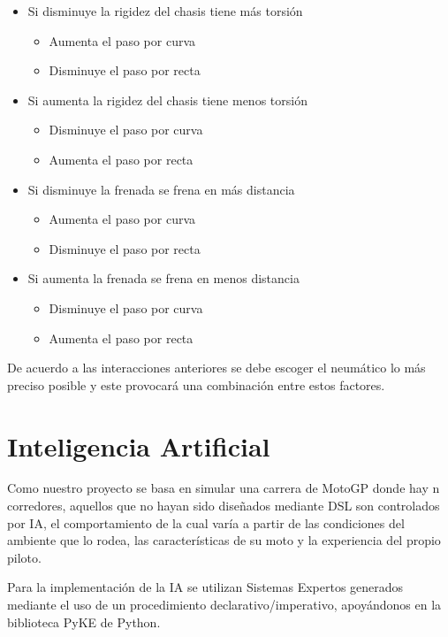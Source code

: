 \documentclass[12pt, letterpaper,spanish]{article}
\theoremstyle{definition}
\theoremstyle{remark}
\begin{document}
\begin{itemize}
		\item Si disminuye la rigidez del chasis tiene más torsión
		\begin{itemize}
			\item Aumenta el paso por curva
			\item Disminuye el paso por recta
		\end{itemize}
		\item Si aumenta la rigidez del chasis tiene menos torsión
		\begin{itemize}
			\item Disminuye el paso por curva
			\item Aumenta el paso por recta
		\end{itemize}
		
		\item Si disminuye la frenada se frena en más distancia
		\begin{itemize}
			\item Aumenta el paso por curva
			\item Disminuye el paso por recta
		\end{itemize}
		\item Si aumenta la frenada se frena en menos distancia
		\begin{itemize}
			\item Disminuye el paso por curva
			\item Aumenta el paso por recta
		\end{itemize}
	\end{itemize}
	De acuerdo a las interacciones anteriores se debe escoger el neumático lo más preciso posible y este provocará una combinación entre estos factores.

\section{Inteligencia Artificial}\cite{conferenciasIA}\cite{russell}
	Como nuestro proyecto se basa en simular una carrera de MotoGP donde hay n corredores, aquellos que no hayan sido diseñados mediante DSL son controlados por IA, el comportamiento de la cual varía a partir de las condiciones del ambiente que lo rodea, las características de su moto y la experiencia del propio piloto.
	
	Para la implementación de la IA se utilizan Sistemas Expertos generados mediante el uso de un procedimiento declarativo/imperativo, apoyándonos en la biblioteca PyKE\cite{pyke} de Python.
	
\end{document}
